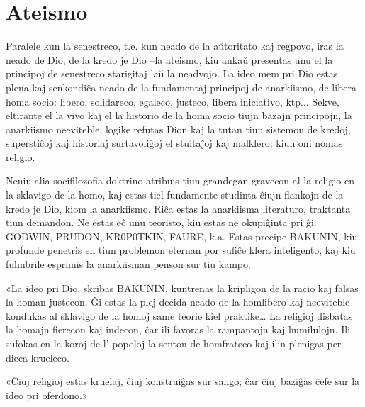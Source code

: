 \section*{Ateismo}
\indent 

Paralele kun la senestreco, t.e. kun neado de la aŭtoritato kaj regpovo, iras la neado de Dio, de la kredo je Dio –la ateismo, kiu ankaŭ presentas unu el la principoj de senestreco starigitaj laŭ la neadvojo. La ideo mem pri Dio estas plena kaj senkondiĉa neado de la fundamentaj principoj de anarkiismo, de libera homa socio: libero, solidareco, egaleco, justeco, libera iniciativo, ktp... Sekve, eltirante el la vivo kaj el la historio de la homa socio tiujn bazajn principojn, la anarkiismo neeviteble, logike refutas Dion kaj la tutan tiun sistemon de kredoj, superstiĉoj kaj historiaj surtavoliĝoj el stultaĵoj kaj malklero, kiun oni nomas religio.

Neniu alia socifilozofia doktrino atribuis tiun grandegan gravecon al la religio en la sklavigo de la homo, kaj estas tiel fundamente studinta ĉiujn flankojn de la kredo je Dio, kiom la anarkiismo. Riĉa estas la anarkiisma literaturo, traktanta tiun demandon. Ne estas eĉ unu teoristo, kiu estas ne okupiĝinta pri ĝi: GODWIN, PRUDON, KR0P0TKIN, FAURE, k.a. Estas precipe BAKUNIN, kiu profunde penetris en tiun problemon eternan por sufiĉe klera inteligento, kaj kiu fulmbrile esprimis la anarkiisman penson sur tiu kampo.

«La ideo pri Dio, skribas BAKUNIN, kuntrenas la kripligon de la racio kaj falsas la homan justecon. Ĝi estas la plej decida neado de la homlibero kaj neeviteble kondukas al sklavigo de la homoj same teorie kiel praktike… La religioj disbatas la homajn fierecon kaj indecon, ĉar ili favoras la rampantojn kaj humilulojn. Ili sufokas en la koroj de l’ popoloj la senton de homfrateco kaj ilin plenigas per dieca krueleco.

«Ĉiuj religioj estas kruelaj, ĉiuj konstruiĝas sur sango; ĉar ĉiuj baziĝas ĉefe sur la ideo pri oferdono.»


